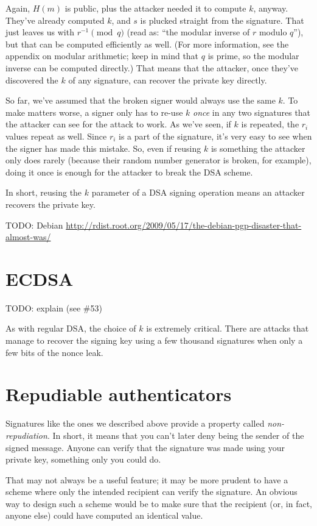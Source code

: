 \documentclass[11pt,ebook,table,dvipsnames]{memoir}
\begin{document}
Again, $H(m)$ is public, plus the attacker needed it to compute $k$,
anyway. They've already computed $k$, and $s$ is plucked straight from
the signature. That just leaves us with $r^{-1} \pmod q$ (read as:
\enquote{the modular inverse of $r$ modulo $q$}), but that can be computed
efficiently as well. (For more information, see the appendix on
modular arithmetic; keep in mind that $q$ is prime, so the modular
inverse can be computed directly.) That means that the attacker, once
they've discovered the $k$ of any signature, can recover the private
key directly.

So far, we've assumed that the broken signer would always use the same
$k$. To make matters worse, a signer only has to re-use $k$ \emph{once} in
any two signatures that the attacker can see for the attack to work.
As we've seen, if $k$ is repeated, the $r_i$ values repeat as well.
Since $r_i$ is a part of the signature, it's very easy to see when the
signer has made this mistake. So, even if reusing $k$ is something the
attacker only does rarely (because their random number generator is
broken, for example), doing it once is enough for the attacker to
break the DSA scheme.

In short, reusing the $k$ parameter of a DSA signing operation means
an attacker recovers the private key.

TODO: Debian \url{http://rdist.root.org/2009/05/17/the-debian-pgp-disaster-that-almost-was/}
\section{ECDSA}
\label{sec-2-8-4}

TODO: explain (see \#53)

As with regular DSA, the choice of $k$ is extremely critical. There
are attacks that manage to recover the signing key using a few
thousand signatures when only a few bits of the nonce leak.
\cite{demulder:ecdsa}
\section{Repudiable authenticators}
\label{sec-2-8-5}

Signatures like the ones we described above provide a property called
\emph{non-repudiation}. In short, it means that you can't later deny being
the sender of the signed message. Anyone can verify that the signature
was made using your private key, something only you could do.

That may not always be a useful feature; it may be more prudent to
have a scheme where only the intended recipient can verify the
signature. An obvious way to design such a scheme would be to make
sure that the recipient (or, in fact, anyone else) could have
computed an identical value.
\end{document}
